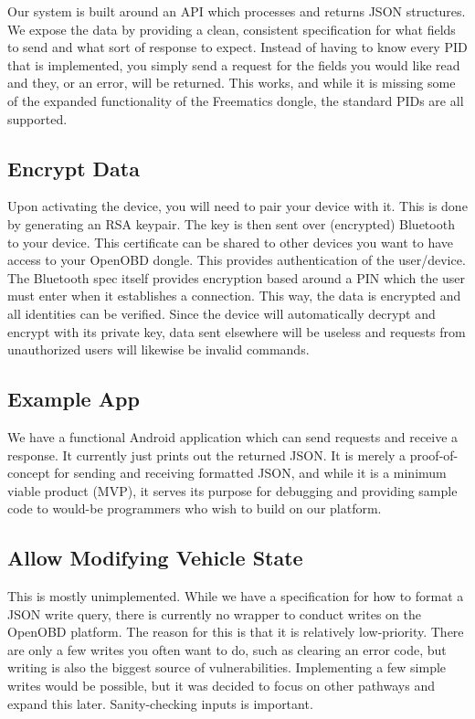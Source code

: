 \documentclass[10pt,letterpaper,unboxed,cm]{article}
\begin{document}
Our system is built around an API which processes and returns JSON structures. We expose the data by providing a clean, consistent specification for what fields to send and what sort of response to expect. Instead of having to know every PID that is implemented, you simply send a request for the fields you would like read and they, or an error, will be returned. This works, and while it is missing some of the expanded functionality of the Freematics dongle, the standard PIDs are all supported.

\subsection{Encrypt Data}

Upon activating the device, you will need to pair your device with it. This is done by generating an RSA keypair. The  key is then sent over (encrypted) Bluetooth to your device. This certificate can be shared to other devices you want to have access to your OpenOBD dongle. This provides authentication of the user/device. The Bluetooth spec itself provides encryption based around a PIN which the user must enter when it establishes a connection. This way, the data is encrypted and all identities can be verified. Since the device will automatically decrypt and encrypt with its private key, data sent elsewhere will be useless and requests from unauthorized users will likewise be invalid commands.

\subsection{Example App}

We have a functional Android application which can send requests and receive a response. It currently just prints out the returned JSON. It is merely a proof-of-concept for sending and receiving formatted JSON, and while it is a minimum viable product (MVP), it serves its purpose for debugging and providing sample code to would-be programmers who wish to build on our platform.

\subsection{Allow Modifying Vehicle State}

This is mostly unimplemented. While we have a specification for how to format a JSON write query, there is currently no wrapper to conduct writes on the OpenOBD platform. The reason for this is that it is relatively low-priority. There are only a few writes you often want to do, such as clearing an error code, but writing is also the biggest source of vulnerabilities. Implementing a few simple writes would be possible, but it was decided to focus on other pathways and expand this later. Sanity-checking inputs is important.
\end{document}
